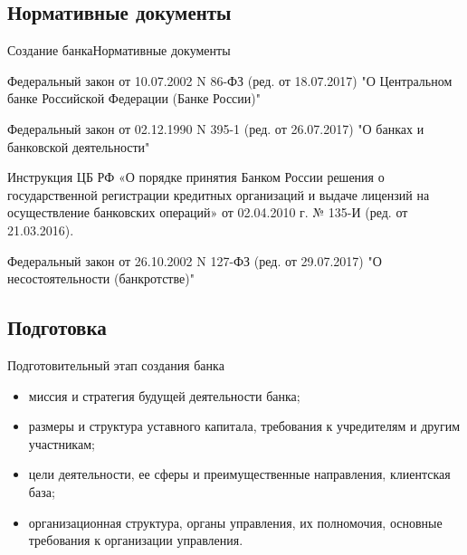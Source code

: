 \documentclass[_Banking_p1.tex]{subfiles}
\begin{document}

\subsection{Нормативные документы}

\begin{frame}[allowframebreaks]{Создание банка}{Нормативные документы}
  \begin{thebibliography}{10}
  
  \beamertemplatearticlebibitems

Федеральный закон от 10.07.2002 N 86-ФЗ (ред. от 18.07.2017) "О Центральном банке Российской Федерации (Банке России)"

Федеральный закон от 02.12.1990 N 395-1 (ред. от 26.07.2017) "О банках и банковской деятельности"

\pagebreak

Инструкция ЦБ РФ «О порядке принятия Банком России решения о государственной регистрации кредитных организаций и выдаче лицензий на осуществление банковских операций» от 02.04.2010 г. № 135-И  (ред. от 21.03.2016).

Федеральный закон от 26.10.2002 N 127-ФЗ (ред. от 29.07.2017) "О несостоятельности (банкротстве)"


  \end{thebibliography}
\end{frame}

\subsection{Подготовка}
\begin{frame}{Подготовительный этап создания банка}{}
\begin{itemize}[<+->]
\item
миссия и стратегия будущей деятельности банка;
\item
размеры и структура уставного капитала, требования к учредителям и другим участникам;
\item
цели деятельности, ее сферы и преимущественные направления, клиентская база;
\item
организационная структура, органы управления, их полномочия, основные требования к организации управления.
\end{itemize}
\end{frame}
\end{document}
